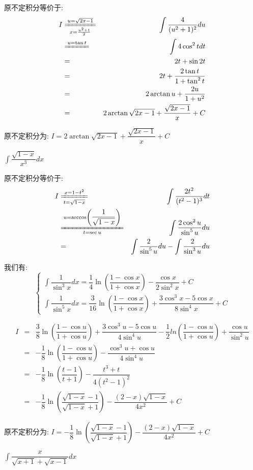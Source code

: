 \begin{solution}
		
	原不定积分等价于:  
	\begin{eqnarray*}
		I&\xlongequal[x=\frac{u^2+1}{2}]{u=\sqrt{2x-1}}&\int \dfrac{4}{(u^2+1)^2}du\\
		&\xlongequal{u=\tan t}&\int 4\cos^2 tdt\\
		&=&2t+\sin 2t\\
		&=&2t+\dfrac{2\tan t}{1+\tan^2t}\\
		&=&2\arctan u+\dfrac{2u}{1+u^2}\\
		&=&2\arctan\sqrt{2x-1}+\dfrac{\sqrt{2x-1}}{x}+C
	\end{eqnarray*}
	
	原不定积分为:  $I=2\arctan\sqrt{2x-1}+\dfrac{\sqrt{2x-1}}{x}+C$
\end{solution}
\begin{proposition}
	$\int \dfrac{\sqrt{1-x}}{x^3}dx$
\end{proposition}
\begin{solution}
		
	原不定积分等价于:  
	\begin{eqnarray*}
		I&\xlongequal[t=\sqrt{1-x}]{x=1-t^2}&\int \dfrac{2t^2}{(t^2-1)^3}dt\\
		&\xlongequal[t=\sec u]{u=\arccos\left(\dfrac{1}{\sqrt{1-x}}\right)}&\int \dfrac{2\cos^2u}{\sin^5 u}du\\
		&=&\int \dfrac{2}{\sin^5 u}du-\int \dfrac{2}{\sin^3 u}du	
	\end{eqnarray*}
	
	我们有:
	$$\left\lbrace
	\begin{array}{l}
		\int \dfrac{1}{\sin^3 x}dx=\dfrac{1}{4}\ln\left(\dfrac{1-\cos x}{1+\cos x} \right)-\dfrac{\cos x}{2\sin^2 x}+C\\
		\int \dfrac{1}{\sin^5 x}dx=\dfrac{3}{16}\ln\left(\dfrac{1-\cos x}{1+\cos x} \right)+\dfrac{3\cos^3 x-5\cos x}{8\sin^4x}+C
	\end{array}
	\right. $$
	
	\begin{eqnarray*}
		I&=&\dfrac{3}{8}\ln\left(\dfrac{1-\cos u}{1+\cos u} \right)+\dfrac{3\cos^3 u-5\cos u}{4\sin^4u}-\dfrac{1}{2}ln\left(\dfrac{1-\cos u}{1+\cos u} \right)+\dfrac{\cos u}{\sin^2 u}\\
		&=&-\dfrac{1}{8}\ln\left(\dfrac{1-\cos u}{1+\cos u} \right)-\dfrac{\cos^3 u+\cos u}{4\sin^4 u}\\
		&=&-\dfrac{1}{8}\ln\left(\dfrac{t-1}{t+1} \right)-\dfrac{t^3+t}{4(t^2-1)^2}\\
		&=&-\dfrac{1}{8}\ln\left(\dfrac{\sqrt{1-x}-1}{\sqrt{1-x}+1} \right)-\dfrac{(2-x)\sqrt{1-x}}{4x^2}+C
	\end{eqnarray*}

	原不定积分为:  $I=-\dfrac{1}{8}\ln\left(\dfrac{\sqrt{1-x}-1}{\sqrt{1-x}+1} \right)-\dfrac{(2-x)\sqrt{1-x}}{4x^2}+C$
\end{solution}
\begin{proposition}
	$\int \dfrac{x}{\sqrt{x+1}+\sqrt{x-1}}dx$
\end{proposition}

